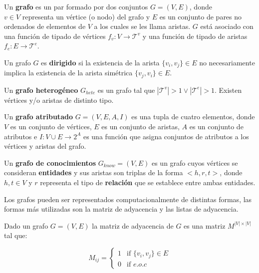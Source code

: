 \begin{definition}
    Un \textbf{grafo} es un par formado por dos conjuntos $G = (V,E)$, 
    donde \\ $v \in V$ representa un v\'ertice (o nodo) del grafo y $E$ es un conjunto
    de pares no ordenados de elementos de $V$ a los cuales se les llama aristas. $G$ est\'a asociado con una funci\'on de tipado de v\'ertices $f_v: V \to \mathcal{T}^v$ y 
    una funci\'on de tipado de aristas $f_e : E \to \mathcal{T}^e$.  
\end{definition}

\begin{definition}
    Un grafo $G$ es \textbf{dirigido} si la existencia de la arista $\{v_i, v_j\} \in E$ no
    necesariamente implica la existencia de la arista sim\'etrica $\{v_j, v_i\} \in E$.
\end{definition}

\begin{definition}
    Un \textbf{grafo heterog\'eneo} $G_{hete}$ es un grafo tal 
    que $|\mathcal{T}^v| > 1 \vee |\mathcal{T}^e| > 1$. Existen v\'ertices y/o aristas
    de distinto tipo.
\end{definition}

\begin{definition}
    Un \textbf{grafo atributado} $G = (V,E,A,I)$ es una tupla de cuatro
    elementos, donde $V$ es un conjunto
    de v\'ertices, $E$ es un conjunto de aristas, $A$ es un
    conjunto de atributos e $I : V \cup E \to 2^A$ es una
    funci\'on que asigna conjuntos de atributos a los v\'ertices
    y aristas del grafo.
\end{definition}

\begin{definition}
    Un \textbf{grafo de conocimientos} $G_{know} = (V,E)$ es un grafo cuyos v\'ertices
    se consideran \textbf{entidades} y sus aristas son triplas de la forma $<h,r,t>$,
    donde $h, t \in V$ y $r$ representa el tipo de \textbf{relaci\'on} que se establece entre
    ambas entidades. 
\end{definition}



Los grafos pueden ser representados computacionalmente de distintas formas, las formas
m\'as utilizadas son la matriz de adyacencia y las listas de adyacencia.


\begin{definition}
    Dado un grafo $G = (V,E)$ la matriz de adyacencia de $G$ es una matriz
    $M^{|V|\times|V|}$ tal que:
    
    $$
            M_{ij} =
        \left\{
            \begin{array}{ll}
                1  & \mbox{if } \{v_i, v_j\} \in E \\
                0 & \mbox{if } e.o.c
            \end{array}
        \right.
    $$

\end{definition}


